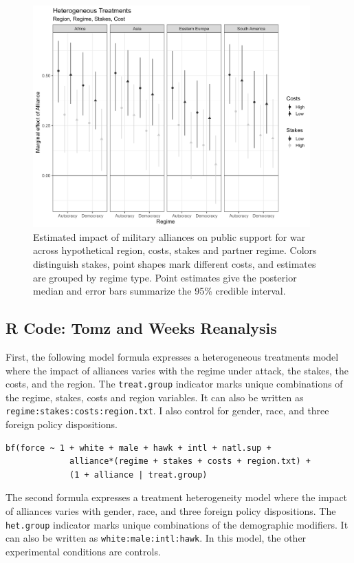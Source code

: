 \documentclass[12pt]{article}
\begin{document}
\begin{figure}[htpb]
	\centering
		\includegraphics[width=0.95\textwidth]{tw-het-treat.png}
	\caption{Estimated impact of military alliances on public support for war across hypothetical region, costs, stakes and partner regime. Colors distinguish stakes, point shapes mark different costs, and estimates are grouped by regime type. Point estimates give the posterior median and error bars summarize the 95\% credible interval.}
	\label{fig:tw-het-treat}
\end{figure}


\subsection{R Code: Tomz and Weeks Reanalysis}

First, the following model formula expresses a heterogeneous treatments model where the impact of alliances varies with the regime under attack, the stakes, the costs, and the region. 
The \verb+treat.group+ indicator marks unique combinations of the regime, stakes, costs and region variables. 
It can also be written as \verb+regime:stakes:costs:region.txt+. 
I also control for gender, race, and three foreign policy dispositions. 

\begin{verbatim}
bf(force ~ 1 + white + male + hawk + intl + natl.sup + 
             alliance*(regime + stakes + costs + region.txt) + 
             (1 + alliance | treat.group) 
\end{verbatim}


The second formula expresses a treatment heterogeneity model where the impact of alliances varies with gender, race, and three foreign policy dispositions. 
The \verb+het.group+ indicator marks unique combinations of the demographic modifiers.
It can also be written as \verb+white:male:intl:hawk+. 
In this model, the other experimental conditions are controls. 
\end{document}
